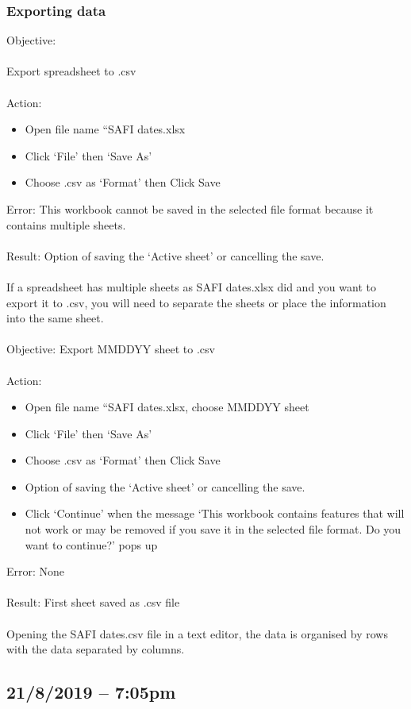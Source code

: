 \documentclass{article}
\begin{document}
\subsubsection*{Exporting data}\label{sec: CSVexport}
Objective:\\\\
Export spreadsheet to .csv\\\\
Action:
\begin{itemize}
\item Open file name “SAFI dates.xlsx
\item Click ‘File’ then ‘Save As’
\item Choose .csv as ‘Format’ then Click Save
\end{itemize}
Error: This workbook cannot be saved in the selected file format because it contains multiple sheets.\\\\
Result: Option of saving the ‘Active sheet’ or cancelling the save.\\\\
If a spreadsheet has multiple sheets as SAFI dates.xlsx did and you want to export it to .csv, you will need to separate the sheets or place the information into the same sheet.\\\\
Objective: Export MMDDYY sheet to .csv\\\\
Action:
\begin{itemize}
\item Open file name “SAFI dates.xlsx, choose MMDDYY sheet
\item Click ‘File’ then ‘Save As’
\item Choose .csv as ‘Format’ then Click Save
\item Option of saving the ‘Active sheet’ or cancelling the save.
\item Click ‘Continue’ when the message ‘This workbook contains features that will not work or may be removed if you save it in the selected file format. Do you want to continue?’ pops up
\end{itemize}
Error: None\\\\
Result: First sheet saved as .csv file\\\\
Opening the SAFI dates.csv file in a text editor, the data is organised by rows with the data separated by columns.
\subsection*{21/8/2019 – 7:05pm}
\end{document}
